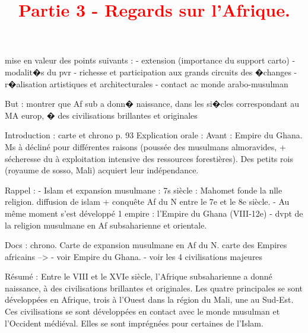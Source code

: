 \documentclass{beamer}
\begin{document}
\begin{frame}
 \titlepage %
 \end{frame}
 
 \begin{frame}
 \tableofcontents
 \end{frame}
      \title{{\textcolor{red}{Partie 3 - Regards sur l'Afrique.}}}
      

mise en valeur des points suivants : 
- extension (importance du support carto)
- modalit�s du pvr
- richesse et participation aux grands circuits des �changes
- r�alisation artistiques et architecturales
- contact ac monde arabo-musulman

But : montrer que Af sub a donn� naissance, dans les si�cles correspondant au MA europ, � des civilisations brillantes et originales

Introduction : 
carte et chrono p. 93
Explication orale : Avant : Empire du Ghana. Ms à décliné pour différentes raisons (poussée des musulmans almoravides, + sécheresse du à exploitation intensive des ressources forestières).
Des petits rois (royaume de sosso, Mali) acquiert leur indépendance.

Rappel : 
- Islam et expansion musulmane : 7s siècle : Mahomet fonde la nlle religion. diffusion de islam + conquête Af du N entre le 7e et le 8e siècle.
- Au même moment s'est développé 1 empire : l'Empire du Ghana (VIII-12e)
- dvpt de la religion musulmane en Af subsaharienne et orientale.

Docs : 
chrono.
Carte de expansion musulmane en Af du N.
carte des Empires africains --> 
- voir Empire du Ghana.
- voir les 4 civilisations majeures

Résumé : Entre le VIII et le XVIe siècle, l'Afrique subsaharienne a donné naissance, à des civilisations brillantes et originales. Les quatre principales se sont développées en Afrique, trois à l'Ouest dans la région du Mali, une au Sud-Est. Ces civilisations se sont développées en contact avec le monde musulman et l'Occident médiéval. Elles se sont imprégnées pour certaines de l'Islam.
\end{document}
